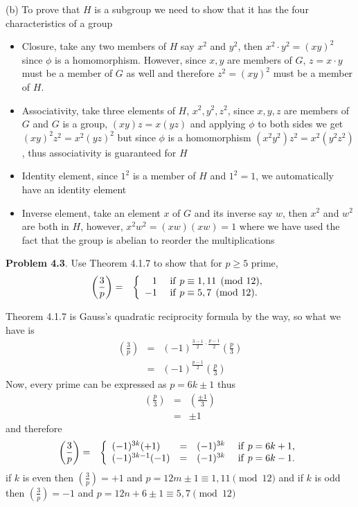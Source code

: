 \documentclass[aps,preprint,preprintnumbers,nofootinbib,showpacs,prd]{revtex4-1}
\newcommand{\bit}{\begin{itemize}}
\newcommand{\eit}{\end{itemize}}
\newcommand{\nbea}{\begin{eqnarray*}}
\newcommand{\neea}{\end{eqnarray*}}
\begin{document}
(b) To prove that $H$ is a subgroup we need to show that it has the four characteristics of a group
%
\bit
\item Closure, take any two members of $H$ say $x^2$ and $y^2$, then $x^2 \cdot y^2 = (xy)^2$ since $\phi$ is a homomorphism. However, since $x,y$ are members of $G$, $z = x\cdot y$ must be a member of $G$ as well and therefore $z^2 = (xy)^2$ must be a member of $H$.
\item Associativity, take three elements of $H$, $x^2,y^2,z^2$, since $x,y,z$ are members of $G$ and $G$ is a group, $(xy)z = x(yz)$ and applying $\phi$ to both sides we get $(xy)^2z^2 = x^2(yz)^2$ but since $\phi$ is a homomorphism $(x^2y^2)z^2 = x^2(y^2z^2)$, thus associativity is guaranteed for $H$
\item Identity element, since $1^2$ is a member of $H$ and $1^2=1$, we automatically have an identity element
\item Inverse element, take an element $x$ of $G$ and its inverse say $w$, then $x^2$ and $w^2$ are both in $H$, however, $x^2w^2 = (xw)(xw) = 1$ where we have used the fact that the group is abelian to reorder the multiplications
\eit
%



{\bf Problem 4.3}. Use Theorem 4.1.7 to show that for $p \ge 5$ prime, 
%
\nbea
\left( \frac{3}{p} \right ) & = & \left \{
\begin{array}{r l}
 1 & {\rm~if~} p \equiv 1,11 \pmod {12},\\ 
 -1 & {\rm~if~} p \equiv 5,7 \pmod {12}.
\end{array} \right.
\neea
%

Theorem 4.1.7 is Gauss's quadratic reciprocity formula by the way, so what we have is
%
\nbea
\left( \frac{3}{p} \right ) & = & (-1)^{\frac{3-1}{2}\cdot\frac{p-1}{2}} \left( \frac{p}{3} \right ) \\
& = & (-1)^{\frac{p-1}{2}} \left( \frac{p}{3} \right ) 
\neea
%
Now, every prime can be expressed as $p = 6k \pm 1$ thus
%
\nbea
\left( \frac{p}{3} \right ) & = & \left( \frac{\pm 1}{3} \right ) \\
& = & \pm 1
\neea
%
and therefore
%
\nbea
\left( \frac{3}{p} \right ) & = & \left \{
\begin{array}{l c l l}
(-1)^{3k}(+1) & = & (-1)^{3k} & {\rm~if~} p = 6k + 1,\\ 
(-1)^{3k-1}(-1) & = & (-1)^{3k} & {\rm~if~} p = 6k - 1.
\end{array} \right.
\neea
%
if $k$ is even then $\left( \frac{3}{p} \right ) = +1$ and $p = 12m \pm 1 \equiv 1,11 \pmod{12}$ and if $k$ is odd then $\left( \frac{3}{p} \right ) = -1$ and $p = 12n + 6 \pm 1 \equiv 5,7 \pmod{12}$
\end{document}

